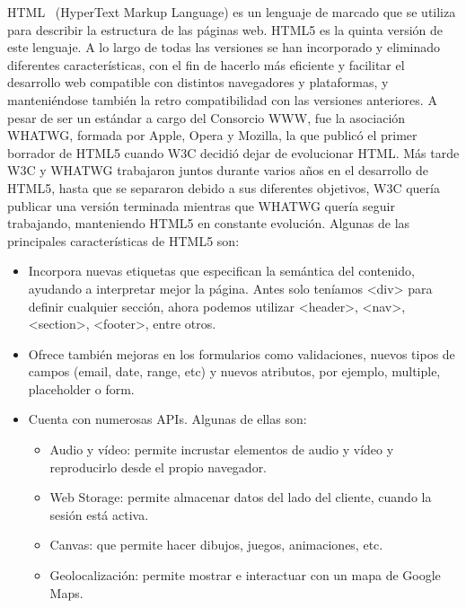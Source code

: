 \documentclass[a4paper, 12pt]{book}
\begin{document}
HTML~\cite{htmlw3,htmlwhat} (HyperText Markup Language) es un lenguaje de marcado que se utiliza para describir la estructura de las páginas web. HTML5 es la quinta versión de este lenguaje. A lo largo de todas las versiones se han incorporado y eliminado diferentes características, con el fin de hacerlo más eficiente y facilitar el desarrollo web compatible con distintos navegadores y plataformas, y manteniéndose también la retro compatibilidad con las versiones anteriores.
A pesar de ser un estándar a cargo del Consorcio WWW, fue la asociación WHATWG, formada por Apple, Opera y Mozilla, la que publicó el primer borrador de HTML5 cuando W3C decidió dejar de evolucionar HTML. Más tarde W3C y WHATWG trabajaron juntos durante varios años en el desarrollo de HTML5, hasta que se separaron debido a sus diferentes objetivos, W3C quería publicar una versión terminada mientras que WHATWG quería seguir trabajando, manteniendo HTML5 en constante evolución.
Algunas de las principales características de HTML5 son:
\begin{itemize}
	\item Incorpora nuevas etiquetas que especifican la semántica del contenido, ayudando a interpretar mejor la página. Antes solo teníamos \textless{}div\textgreater{} para definir cualquier sección, ahora podemos utilizar \textless{}header\textgreater{}, \textless{}nav\textgreater{}, \textless{}section\textgreater{}, \textless{}footer\textgreater{}, entre otros.

	\item Ofrece también mejoras en los formularios como validaciones, nuevos tipos de campos (email, date, range, etc) y nuevos atributos, por ejemplo, multiple, placeholder o form.

	\item Cuenta con numerosas APIs. Algunas de ellas son:

	\begin{itemize}

		\item Audio y vídeo: permite incrustar elementos de audio y vídeo y reproducirlo desde el propio navegador.

		\item Web Storage: permite almacenar datos del lado del cliente, cuando la sesión está activa.

       	\item Canvas: que permite hacer dibujos, juegos, animaciones, etc.

		\item Geolocalización: permite mostrar e interactuar con un mapa de Google Maps.

	\end{itemize}
\end{itemize}
\end{document}
